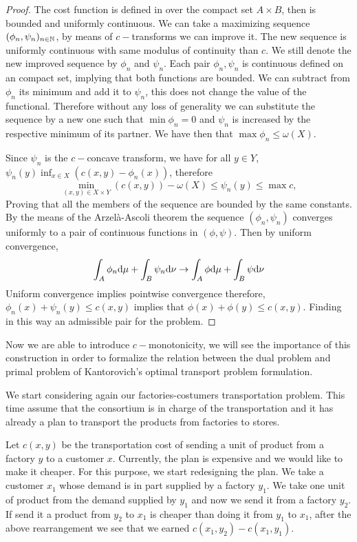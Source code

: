 \begin{proof}
The cost function is defined in over the compact set $A\times B$, then is bounded and uniformly continuous. We can take a maximizing sequence $(\phi_n, \psi_n)_{n\in \mathbb{N}}$, by means of $c-$transforms we can improve it. The new sequence is uniformly continuous with same modulus of continuity than $c$.  We still denote the new improved sequence by $\phi_n$ and $\psi_n$. Each pair $\phi_n, \psi_n$ is continuous defined on an compact set, implying that both functions are bounded. We can subtract from $\phi_n$ its minimum and add it to $\psi_n$, this does not change the value of the functional. Therefore without any loss of generality we can substitute the sequence by a new one such that $\min \phi_n =0$ and $\psi_n$ is increased by the respective minimum of its partner. We have then that $\max \phi_n \leq \omega(X)$.

Since $\psi_n$ is the $c-$concave transform, we have for all $y\in Y$, $\psi_n(y)\inf_{x\in X}(c(x,y)-\phi_n(x))$, therefore
 \begin{equation}
 	\min_{(x,y)\in X\times Y}(c(x,y))-\omega(X)\leq\psi_n(y)\leq \max c,
 \end{equation}
 Proving that all the members of the sequence are bounded by the same constants.  By the means of the Arzel\`a-Ascoli theorem the sequence $(\phi_n, \psi_n)$ converges uniformly to a pair of continuous functions in $(\phi, \psi)$. Then by uniform convergence,
 \begin{equation}
 	\int_A \phi_n\mathrm{d}\mu + \int_B \psi_n\mathrm{d}\nu\rightarrow  	\int_A \phi\mathrm{d}\mu + \int_B \psi\mathrm{d}\nu
 \end{equation} 
 Uniform convergence implies pointwise convergence therefore, $\phi_n(x)+\psi_n(y)\leq c(x,y)$ implies that $\phi(x)+\phi(y)\leq c(x,y)$. Finding in this way an admissible pair for the problem.
\end{proof}


Now we are able to introduce $c-$monotonicity, we will see the importance of this construction in order to formalize the relation between the dual problem and primal problem of Kantorovich's optimal transport problem formulation. 

We start considering again our factories-costumers transportation problem. This time assume that the consortium is in charge of the transportation and it has already a plan to transport the products from factories to stores. 

Let $c(x,y)$ be the transportation cost of sending a unit of product from a factory $y$ to a customer $x$. Currently, the plan is expensive and we would like to make it cheaper.  For this purpose, we start redesigning the plan. We take a customer $x_1$ whose demand is in part supplied by a factory $y_1$. We take one unit of product from the demand supplied by $y_1$ and now we send it from a factory $y_2$. If send it a product from $y_2$ to $x_1$ is cheaper than doing it from $y_1$ to $x_1$, after the above rearrangement we see that we earned $c(x_1, y_2)-c(x_1,y_1)$. 

